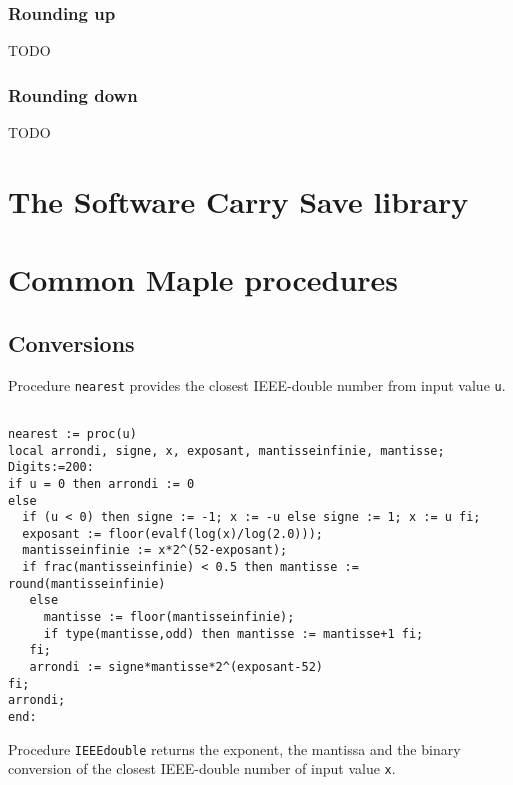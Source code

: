 \subsubsection{Rounding up}

TODO

\subsubsection{Rounding down}

TODO







\section{The Software Carry Save library}







\section{Common Maple procedures \label{section:commonMaple}}


\subsection{Conversions}

Procedure \texttt{nearest} provides the closest IEEE-double number
from input value \texttt{u}.

\begin{lstlisting}[caption={nearest},firstnumber=1]

nearest := proc(u)
local arrondi, signe, x, exposant, mantisseinfinie, mantisse;
Digits:=200:
if u = 0 then arrondi := 0
else 
  if (u < 0) then signe := -1; x := -u else signe := 1; x := u fi;
  exposant := floor(evalf(log(x)/log(2.0)));
  mantisseinfinie := x*2^(52-exposant);
  if frac(mantisseinfinie) < 0.5 then mantisse := round(mantisseinfinie)
   else
     mantisse := floor(mantisseinfinie);
     if type(mantisse,odd) then mantisse := mantisse+1 fi;
   fi;
   arrondi := signe*mantisse*2^(exposant-52)
fi;
arrondi;
end:
\end{lstlisting}



Procedure \texttt{IEEEdouble} returns the exponent, the mantissa and the
binary conversion of the closest IEEE-double number of input value \texttt{x}.

